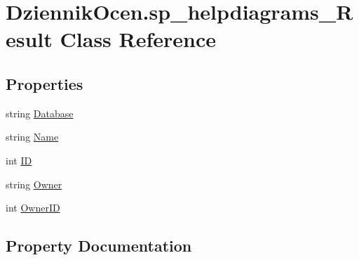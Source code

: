 \hypertarget{class_dziennik_ocen_1_1sp__helpdiagrams___result}{}\section{Dziennik\+Ocen.\+sp\+\_\+helpdiagrams\+\_\+\+Result Class Reference}
\label{class_dziennik_ocen_1_1sp__helpdiagrams___result}
\subsection*{Properties}
\begin{DoxyCompactItemize}
\item 
string \hyperlink{class_dziennik_ocen_1_1sp__helpdiagrams___result_aa223c11ce5ef7b60f80c63f777dd5730}{Database}
\item 
string \hyperlink{class_dziennik_ocen_1_1sp__helpdiagrams___result_a4e2f39153dee2d4b3ee474b4ac3da7bf}{Name}
\item 
int \hyperlink{class_dziennik_ocen_1_1sp__helpdiagrams___result_ab4dc95a985ba5b4995ac3257e39e94d1}{ID}
\item 
string \hyperlink{class_dziennik_ocen_1_1sp__helpdiagrams___result_af251284439380c6d9344f89750a8c7d9}{Owner}
\item 
int \hyperlink{class_dziennik_ocen_1_1sp__helpdiagrams___result_a8679d4a8037817f7d591562ecf35b927}{Owner\+ID}
\end{DoxyCompactItemize}


\subsection{Property Documentation}
\mbox{\label{class_dziennik_ocen_1_1sp__helpdiagrams___result_aa223c11ce5ef7b60f80c63f777dd5730}} 
